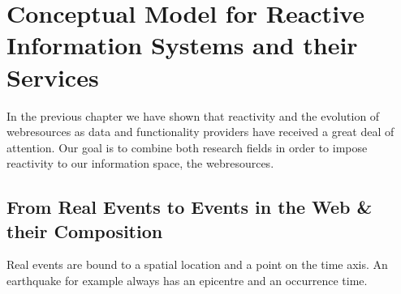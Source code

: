 
\chapter{Conceptual Model for Reactive Information Systems and their Services}

%


In the previous chapter we have shown that reactivity and the evolution of \textrm{\glspl{webresource}} as data and functionality providers have received a great deal of attention.
Our goal is to combine both research fields in order to impose reactivity to our information space, the \textrm{\glspl{webresource}}. 

\section{From Real Events to Events in the Web \& their Composition}
Real events are bound to a spatial location and a point on the time axis.
An earthquake for example always has an epicentre and an occurrence time.








